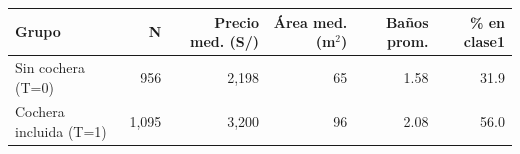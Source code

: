 \begin{tabular}{lrrrrr}
\toprule
Grupo & N & Precio med. (S/) & Área med. (m$^2$) & Baños prom. & \% en clase1 \\
\midrule
Sin cochera (T=0) & 956 & 2,198 & 65 & 1.58 & 31.9 \\
Cochera incluida (T=1) & 1,095 & 3,200 & 96 & 2.08 & 56.0 \\
\bottomrule
\end{tabular}